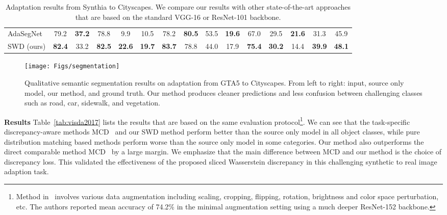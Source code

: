 \documentclass[10pt,twocolumn,letterpaper]{article}
\begin{document}
\begin{table*}[tbp]
\begin{center}
{\begin{tabular}{l|ccccccccccccc|c }
AdaSegNet~\cite{tsai2018learning} & 79.2 & \bf 37.2 & 78.8 & 9.9 & 10.5 & 78.2 & \bf 80.5 & 53.5 & \bf 19.6 & 67.0 & 29.5 & \bf 21.6 & 31.3 & 45.9  \\
SWD (ours) & \bf 82.4 & 33.2 & \bf 82.5 & \bf 22.6 & \bf 19.7 & \bf 83.7 & 78.8 & 44.0 & 17.9 & \bf 75.4 & \bf 30.2 & 14.4 & \bf 39.9 & \bf 48.1\\
\bottomrule
  \end{tabular}
  }
  \end{center}
   \vspace{-6mm}
     \caption{Adaptation results from Synthia to Cityscapes. We compare our results with other state-of-the-art approaches that are based on the standard VGG-16 or ResNet-101 backbone.}
      \label{tb:synthia2city}
      \vspace{-3mm}
\end{table*} \begin{figure*}[h]
\begin{center}
\texttt{[image: Figs/segmentation]}
\end{center}
\vspace{-6mm}
   \caption{Qualitative semantic segmentation results on adaptation from GTA5 to Cityscapes. From left to right: input, source only model, our method, and ground truth. Our method produces cleaner predictions and less confusion between challenging classes such as road, car, sidewalk, and vegetation.}
\label{fig:segmentation}
\vspace{-3mm}
\end{figure*}

\vspace{2mm}
\noindent \textbf{Results}
Table~\ref{tab:visda2017} lists the results that are based on the same evaluation protocol\footnote{Method in~\cite{french2017self} involves various data augmentation including scaling, cropping, flipping, rotation, brightness and color space perturbation, etc. The authors reported mean accuracy of 74.2$\%$ in the minimal augmentation setting using a much deeper ResNet-152 backbone.}. We can see that the task-specific discrepancy-aware methods MCD~\cite{saito2017maximum} and our SWD method perform better than the source only model in all object classes, while pure distribution matching based methods perform worse than the source only model in some categories.
Our method also outperforms the direct comparable method MCD~\cite{saito2017maximum} by a large margin. We emphasize that the main difference between MCD and our method is the choice of discrepancy loss. This validated the effectiveness of the proposed sliced Wasserstein discrepancy in this challenging synthetic to real image adaption task.
\end{document}
